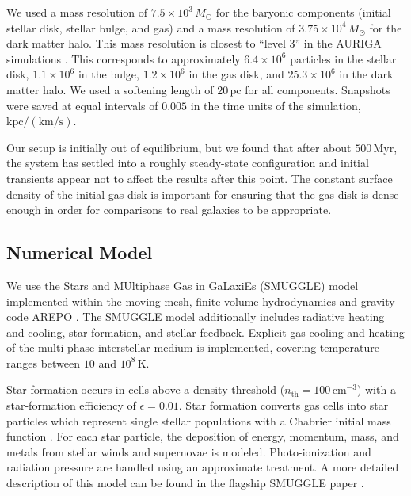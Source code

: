 \documentclass[twocolumn,linenumbers,trackchanges]{aastex631}
\newcommand{\AREPO}{\textsc{AREPO}}
\newcommand{\SMUGGLE}{SMUGGLE}
\begin{document}
We used a mass resolution of $7.5\times10^3\,M_{\odot}$ for the baryonic
components (initial stellar disk, stellar bulge, and gas) and a mass resolution
of $3.75\times10^4\,M_{\odot}$ for the dark matter halo. This mass resolution is
closest to ``level 3'' in the AURIGA simulations \citep{2017MNRAS.467..179G}.
This corresponds to approximately $6.4\times10^6$ particles in the stellar disk,
$1.1\times10^6$ in the bulge, $1.2\times10^6$ in the gas disk, and
$25.3\times10^6$ in the dark matter halo. We used a softening length of
$20\,\textrm{pc}$ for all components. 
Snapshots were saved at equal intervals of $0.005$ in the time units of the
simulation, $\textrm{kpc}/(\textrm{km}/\textrm{s})$.

Our setup is initially out of equilibrium, but we found that after about
$500\,\textrm{Myr}$, the system has settled into a roughly steady-state
configuration and initial transients appear not to affect the results after this
point. The constant surface density of the initial gas disk is important for
ensuring that the gas disk is dense enough in order for comparisons to real
galaxies to be appropriate.

\subsection{Numerical Model}
We use the Stars and MUltiphase Gas in GaLaxiEs (\SMUGGLE{}) model
\citep{2019MNRAS.489.4233M} implemented within the moving-mesh, finite-volume
hydrodynamics and gravity code \AREPO{} \citep{2010MNRAS.401..791S}. The \SMUGGLE{}
model additionally includes radiative heating and cooling, star formation, and
stellar feedback. Explicit gas cooling and heating of the multi-phase
interstellar medium is implemented, covering temperature ranges between $10$ and
$10^8\,\textrm{K}$.

Star formation occurs in cells above a density threshold
($n_{\textrm{th}}=100\,\textrm{cm}^{-3}$) with a star-formation efficiency of
$\epsilon = 0.01$. Star formation converts gas cells into star particles which
represent single stellar populations with a Chabrier initial mass function
\citep{2003PASP..115..763C}. For each star particle, the deposition of energy,
momentum, mass, and metals from stellar winds and supernovae is modeled.
Photo-ionization and radiation pressure are handled using an approximate
treatment. A more detailed description of this model can be found in the
flagship \SMUGGLE{} paper \citep{2019MNRAS.489.4233M}.
\end{document}
